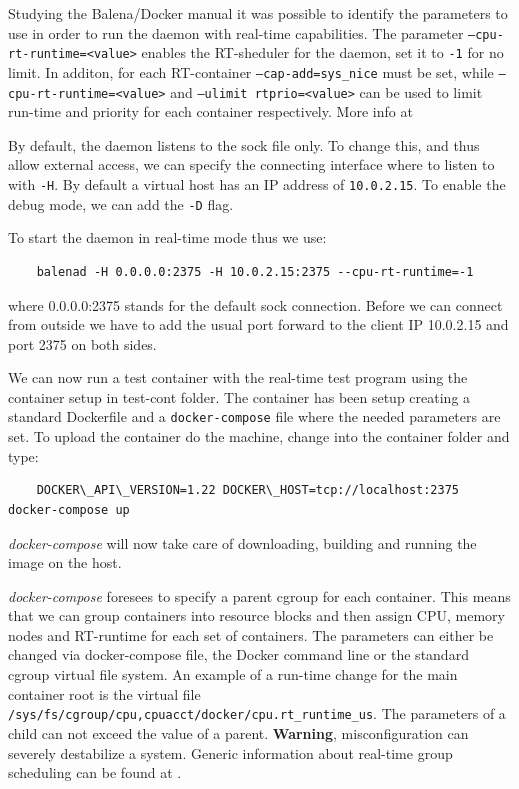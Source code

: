\documentclass[]{scrartcl}
\begin{document}
Studying the Balena/Docker manual it was possible to identify the parameters to use in order to run the daemon with real-time capabilities. The parameter \texttt{--cpu-rt-runtime=<value>} enables the RT-sheduler for the daemon, set it to \texttt{-1} for no limit. In additon, for each RT-container \texttt{--cap-add=sys\_nice} must be set, while \texttt{--cpu-rt-runtime=<value>} and \texttt{--ulimit rtprio=<value>} can be used to limit run-time and priority for each container respectively.
More info at \cite{docker06}

By default, the daemon listens to the sock file only. To change this, and thus allow external access, we can specify the connecting interface where to listen to with \texttt{-H}. By default a virtual host has an IP address of \texttt{10.0.2.15}. To enable the debug mode, we can add the \texttt{-D} flag.

To start the daemon in real-time mode thus we use:

\begin{verbatim}
	balenad -H 0.0.0.0:2375 -H 10.0.2.15:2375 --cpu-rt-runtime=-1
\end{verbatim}

where 0.0.0.0:2375 stands for the default sock connection. Before we can connect from outside we have to add the usual port forward to the client IP 10.0.2.15 and port 2375 on both sides.

We can now run a test container with the real-time test program using the container setup in test-cont folder. The container has been setup creating a standard Dockerfile and a \texttt{docker-compose} file where the needed parameters are set. To upload the container do the machine, change into the container folder and type:

\begin{verbatim}
	DOCKER\_API\_VERSION=1.22 DOCKER\_HOST=tcp://localhost:2375 docker-compose up
\end{verbatim}

\textit{docker-compose} will now take care of downloading, building and running the image on the host.

\textit{docker-compose} foresees to specify a parent cgroup for each container. This means that we can group containers into resource blocks and then assign CPU, memory nodes and RT-runtime for each set of containers.
The parameters can either be changed via docker-compose file, the Docker command line or the standard cgroup virtual file system. An example of a run-time change for the main container root is the virtual file \texttt{/sys/fs/cgroup/cpu,cpuacct/docker/cpu.rt\_runtime\_us}.
The parameters of a child can not exceed the value of a parent. \textbf{Warning}, misconfiguration can severely destabilize a system. Generic information about real-time group scheduling can be found at \cite{kernel01}.
\end{document}
